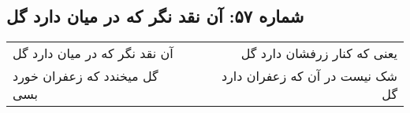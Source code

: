 \begin{center}
\section*{شماره ۵۷: آن نقد نگر که در میان دارد گل}
\label{sec:057}
\begin{longtable}{l p{0.5cm} r}
آن نقد نگر که در میان دارد گل
&&
یعنی که کنار زرفشان دارد گل
\\
گل میخندد که زعفران خورد بسی
&&
شک نیست در آن که زعفران دارد گل
\\
\end{longtable}
\end{center}
